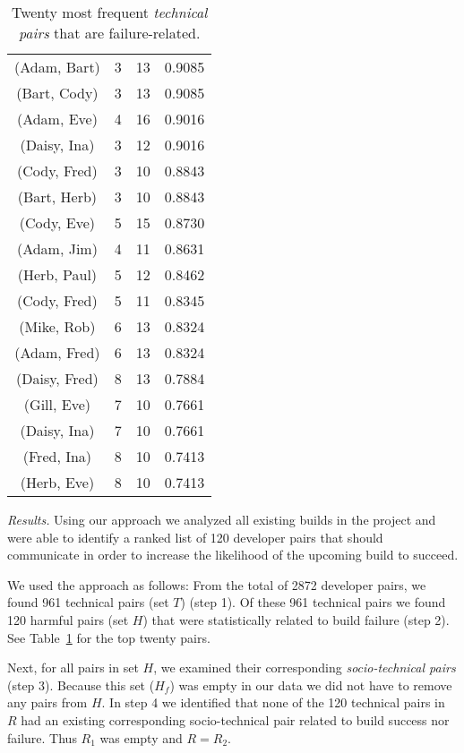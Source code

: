 \begin{table}[t]
\begin{tabular}{@{\hspace{.2cm}}ccc@{\hspace{.75cm}}c@{\hspace{.2cm}}}
(Adam, Bart)	&	3&	13&	0.9085	\\ %
(Bart, Cody)	&	3&	13&	0.9085	\\ %
(Adam, Eve)	&	4&	16&	0.9016	\\ %
(Daisy, Ina)	&	3&	12&	0.9016	\\ %
(Cody, Fred)	&	3&	10&	0.8843	\\ %
(Bart, Herb)	&	3&	10&	0.8843	\\ %
(Cody, Eve)	&	5&	15&	0.8730	\\ %
(Adam, Jim)	&	4&	11&	0.8631	\\ %
(Herb, Paul)	&	5&	12&	0.8462	\\ %
(Cody, Fred)	&	5&	11&	0.8345	\\ %
(Mike, Rob)	&	6&	13&	0.8324	\\ %
(Adam, Fred)	&	6&	13&	0.8324	\\ %
(Daisy, Fred)	&	8&	13&	0.7884	\\ %
(Gill, Eve)		&	7&	10&	0.7661	\\ %
(Daisy, Ina)	&	7&	10&	0.7661	\\ %
(Fred, Ina)	&	8&	10&	0.7413	\\ %
(Herb, Eve)	&	8&	10&	0.7413	\\ %
\bottomrule
\end{tabular}
\caption{Twenty most frequent \emph{technical pairs} that are failure-related.}
\label{tab:badtechpairs}
\end{table}

\emph{Results.}
Using our approach we analyzed all existing builds in the project and were able to identify a ranked list of 120 developer pairs that should communicate in order to increase the likelihood of the upcoming build to succeed. 

We used the approach as follows: From the total of 2872 developer pairs, we found 961 technical pairs (set $T$) (step 1).
Of these 961 technical pairs we found 120 harmful pairs (set $H$) that were statistically related to build failure (step 2). See Table~\ref{tab:badtechpairs} for the top twenty  pairs.

Next, for all pairs in set $H$, we examined their corresponding \emph{socio-technical pairs} (step 3). Because this set ($H_f$) was empty in our data we did not have to remove any pairs from $H$. 
In step 4 we identified that none of the 120 technical pairs in $R$ had an existing corresponding socio-technical pair related to build success nor failure. Thus $R_1$ was empty and $R=R_2$. 

